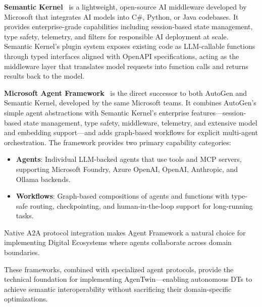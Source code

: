 \textbf{Semantic Kernel}~\cite{gupta2025a}
    is a lightweight, open-source AI middleware developed by Microsoft that integrates
    AI models into C\#, Python, or Java codebases.
It provides enterprise-grade capabilities including session-based state management,
    type safety, telemetry, and filters for responsible AI deployment at scale.
Semantic Kernel's plugin system exposes existing code as LLM-callable functions through
    typed interfaces aligned with OpenAPI specifications,
    acting as the middleware layer that translates model requests into function calls
    and returns results back to the model.

\textbf{Microsoft Agent Framework}~\cite{higuchi2025}
    is the direct successor to both AutoGen and Semantic Kernel, developed by the same
    Microsoft teams.
It combines AutoGen's simple agent abstractions with Semantic Kernel's enterprise
    features—session-based state management, type safety, middleware, telemetry,
    and extensive model and embedding support—and adds graph-based workflows
    for explicit multi-agent orchestration.
The framework provides two primary capability categories:
\begin{itemize}
    \item \textbf{Agents}: Individual LLM-backed agents that use tools and MCP servers,
        supporting Microsoft Foundry, Azure OpenAI, OpenAI, Anthropic, and Ollama backends.
    \item \textbf{Workflows}: Graph-based compositions of agents and functions with
        type-safe routing, checkpointing, and human-in-the-loop support for
        long-running tasks.
\end{itemize}
Native A2A protocol integration makes Agent Framework a natural choice for
    implementing Digital Ecosystems where agents collaborate across domain boundaries.

These frameworks, combined with specialized agent protocols, provide the
    technical foundation for implementing AgenTwin—enabling
    autonomous DTs to achieve semantic interoperability without sacrificing their domain-specific optimizations.
